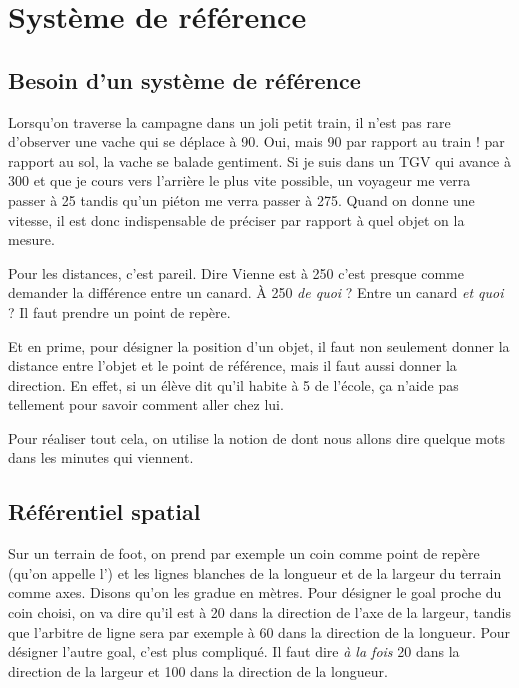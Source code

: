 

\section{Système de référence}

\subsection{Besoin d'un système de référence}

Lorsqu'on traverse la campagne dans un joli petit train, il n'est pas rare d'observer une vache qui se déplace à \unit{90}{\kilo\meter\per\hour}. Oui, mais \unit{90}{\kilo\meter\per\hour} par rapport au train ! par rapport au sol, la vache se balade gentiment. Si je suis dans un TGV qui avance à \unit{300}{\kilo\meter\per\hour} et que je cours vers l'arrière le plus vite possible, un voyageur me verra passer à \unit{25}{\kilo\meter\per\hour} tandis qu'un piéton me verra passer à \unit{275}{\kilo\meter\per\hour}. Quand on donne une vitesse, il est donc indispensable de préciser par rapport à quel objet on la mesure.

Pour les distances, c'est pareil. Dire \og Vienne est à \unit{250}{\kilo\meter} \fg{} c'est presque comme demander la différence entre un canard. À \unit{250}{\kilo\meter} \emph{de quoi} ? Entre un canard \emph{et quoi} ? Il faut prendre un point de repère.

Et en prime, pour désigner la position d'un objet, il faut non seulement donner la distance entre l'objet et le point de référence, mais il faut aussi donner la direction. En effet, si un élève dit qu'il habite à \unit{5}{\kilo\meter} de l'école, ça n'aide pas tellement pour savoir comment aller chez lui.

Pour réaliser tout cela, on utilise la notion de  dont nous allons dire quelque mots dans les minutes qui viennent.  

\subsection{Référentiel spatial}

 Sur un terrain de foot, on prend par exemple un coin comme point de repère (qu'on appelle l') et les lignes blanches de la longueur et de la largeur du terrain comme axes. Disons qu'on les gradue en mètres. Pour désigner le goal proche du coin choisi, on va dire qu'il est à \unit{20}{\meter} dans la direction de l'axe de la largeur, tandis que l'arbitre de ligne sera par exemple à \unit{60}{\meter} dans la direction de la longueur. Pour désigner l'autre goal, c'est plus compliqué. Il faut dire \emph{à la fois} \unit{20}{\meter} dans la direction de la largeur et \unit{100}{\meter} dans la direction de la longueur.

